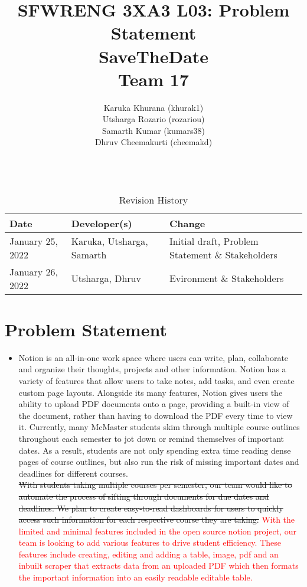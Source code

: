 \documentclass[12pt, titlepage]{article}
\title{SFWRENG 3XA3 L03: Problem Statement
        \\[1ex] \large SaveTheDate\\ Team 17}
\author{
        Karuka Khurana (khurak1)\\
        Utsharga Rozario (rozariou)\\
        Samarth Kumar (kumars38)\\
        Dhruv Cheemakurti (cheemakd)\\
        \\
}
\begin{document}
\maketitle

\tableofcontents
\listoftables
\listoffigures

\begin{table}[!hbp]
    \caption{Revision History} \label{RevisionHistory}
    \begin{tabularx}{\textwidth}{llX}
        \toprule
            \textbf{Date} & \textbf{Developer(s)} & \textbf{Change}\\
        \midrule
            January 25, 2022 & Karuka, Utsharga, Samarth & Initial draft, Problem Statement \& Stakeholders\\
            January 26, 2022 & Utsharga, Dhruv & Evironment \& Stakeholders\\
        \bottomrule
    \end{tabularx}
\end{table}

\newpage

\maketitle

\newpage
\section{Problem Statement}
\begin{itemize}
    \item[] 
    Notion is an all-in-one work space where users can write, plan, collaborate and organize their thoughts, projects and other information. Notion has a variety of features that allow users to take notes, add tasks, and even create custom page layouts. Alongside its many features, Notion gives users the ability to upload PDF documents onto a page, providing a built-in view of the document, rather than having to download the PDF every time to view it. Currently, many McMaster students skim through multiple course outlines throughout each semester to jot down or remind themselves of important dates. As a result, students are not only spending extra time reading dense pages of course outlines, but also run the risk of missing important dates and deadlines for different courses.\\ 

    \sout{With students taking multiple courses per semester, our team would like to automate the process of sifting through documents for due dates and deadlines. We plan to create easy-to-read dashboards for users to quickly access such information for each respective course they are taking.}
    \textcolor{red}{With the limited and minimal features included in the open source notion project, our team is looking to add various features to drive student efficiency. These features include creating, editing and adding a table, image, pdf and an inbuilt scraper that extracts data from an uploaded PDF which then formats the important information into an easily readable editable table.  }
\end{itemize}
\end{document}
